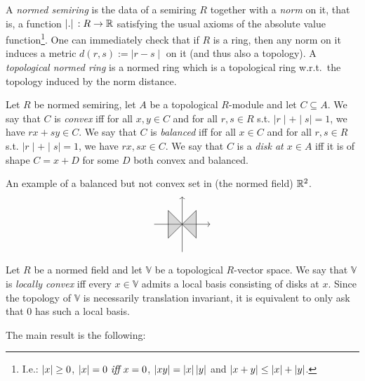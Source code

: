 \begin{definition}
 A \emph{normed semiring} is the data of a semiring $R$ together with a \emph{norm} on it, that is, a function $\left\lvert.\right\rvert\,:R\to\mathbb{R}$ satisfying the usual axioms of the absolute value function\footnote{I.e.: $\left\lvert x\right\rvert\geq 0$, $\left\lvert x\right\rvert =0 \textit{ iff } x=0$, $\left\lvert xy\right\rvert=\left\lvert x\right\rvert\left\lvert y\right\rvert$ and $\left\lvert x+y\right\rvert\leq \left\lvert x\right\rvert+\left\lvert y\right\rvert$.}.
 One can immediately check that if $R$ is a ring, then any norm on it induces a metric $d(r,s):=\mid r-s\mid$ on it (and thus also a topology).
 A \emph{topological normed ring} is a normed ring which is a topological ring w.r.t.\ the topology induced by the norm distance.
\end{definition}

\begin{definition}
 Let $R$ be normed semiring, let $A$ be a topological $R$-module and let $C\subseteq A$.
 We say that $C$ is \emph{convex} iff for all $x,y\in C$ and for all $r,s\in R$ s.t. $\mid r\mid +\mid s\mid =1$, we have $rx+sy\in C$.
 We say that $C$ is \emph{balanced} iff for all $x\in C$ and for all $r,s\in R$ s.t. $\mid r\mid +\mid s\mid =1$, we have $rx,sx\in C$.
 We say that $C$ is a \emph{disk at $x\in A$} iff it is of shape $C=x+D$ for some $D$ both convex and balanced.
\end{definition}

\begin{example}
 An example of a balanced but not convex set in (the normed field) $\mathbb{R}^2$.
 \[\begin{tikzpicture}
 \draw[->] (0,-1) -- (0,1);
 \draw[->] (-1,0) -- (1,0);
 \draw[fill=gray, fill opacity=0.3] (0,0) -- (0.5,-0.5) -- (0.5,0.5) -- (0,0) -- (-0.5,0.5) -- (-0.5,-0.5) -- cycle;
\end{tikzpicture}\]
\end{example}

\begin{definition}
 Let $R$ be a normed field and let $\mathbb{V}$ be a topological $R$-vector space. We say that $\mathbb{V}$ is \emph{locally convex} iff every $x\in \mathbb{V}$ admits a local basis consisting of disks at $x$.
 Since the topology of $\mathbb{V}$ is necessarily translation invariant,
 it is equivalent to only ask that $0$ has such a local basis.
\end{definition}

The main result is the following:

